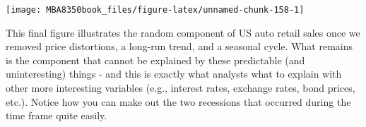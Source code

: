 \documentclass[
]{book}
\newenvironment{Shaded}{\begin{snugshade}}{\end{snugshade}}
\newcommand{\AttributeTok}[1]{\textcolor[rgb]{0.77,0.63,0.00}{#1}}
\newcommand{\ConstantTok}[1]{\textcolor[rgb]{0.00,0.00,0.00}{#1}}
\newcommand{\DecValTok}[1]{\textcolor[rgb]{0.00,0.00,0.81}{#1}}
\newcommand{\FunctionTok}[1]{\textcolor[rgb]{0.00,0.00,0.00}{#1}}
\newcommand{\NormalTok}[1]{#1}
\newcommand{\OtherTok}[1]{\textcolor[rgb]{0.56,0.35,0.01}{#1}}
\newcommand{\SpecialCharTok}[1]{\textcolor[rgb]{0.00,0.00,0.00}{#1}}
\newcommand{\StringTok}[1]{\textcolor[rgb]{0.31,0.60,0.02}{#1}}
\begin{document}
\begin{Shaded}
\end{Shaded}

\begin{center}\texttt{[image: MBA8350book\_files/figure-latex/unnamed-chunk-158-1]} \end{center}

This final figure illustrates the random component of US auto retail sales once we removed price distortions, a long-run trend, and a seasonal cycle. What remains is the component that cannot be explained by these predictable (and uninteresting) things - and this is exactly what analysts what to explain with other more interesting variables (e.g., interest rates, exchange rates, bond prices, etc.). Notice how you can make out the two recessions that occurred during the time frame quite easily.
\end{document}
